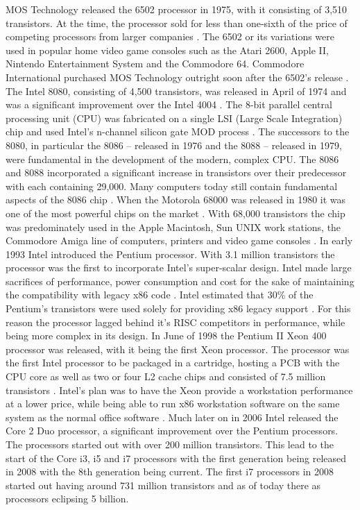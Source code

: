 MOS Technology released the 6502 processor in 1975, with it consisting of 3,510 transistors.
At the time, the processor sold for less than one-sixth of the price of competing processors from larger companies \citep{RN29}.
The 6502 or its variations were used in popular home video game consoles such as the Atari 2600, Apple II, Nintendo Entertainment System and the Commodore 64.
Commodore International purchased MOS Technology outright soon after the 6502’s release \citep{RN29}.
The Intel 8080, consisting of 4,500 transistors, was released in April of 1974 and was a significant improvement over the Intel 4004 \citep{RN8}.
The 8-bit parallel central processing unit (CPU) was fabricated on a single LSI (Large Scale Integration) chip and used Intel’s n-channel silicon gate MOD process \citep{RN10}.
The successors to the 8080, in particular the 8086 – released in 1976 and the 8088 – released in 1979, were fundamental in the development of the modern, complex CPU.
The 8086 and 8088 incorporated a significant increase in transistors over their predecessor with each containing 29,000.
Many computers today still contain fundamental aspects of the 8086 chip \citep{RN11}.  
When the Motorola 68000 was released in 1980 it was one of the most powerful chips on the market \citep{RN18}.
With 68,000 transistors the chip was predominately used in the Apple Macintosh, Sun UNIX work stations, the Commodore Amiga line of computers, printers and video game consoles \citep{RN18}. 
In early 1993 Intel introduced the Pentium processor.
With 3.1 million transistors  \citep{RN13, Intel4584:online} the processor was the first to incorporate Intel’s super-scalar design.
Intel made large sacrifices of performance, power consumption and cost for the sake of maintaining the compatibility with legacy x86 code \citep{RN13}.
Intel estimated that 30\% of the Pentium’s transistors were used solely for providing x86 legacy support \citep{RN7}.
For this reason the processor lagged behind it’s RISC competitors in performance, while being more complex in its design.
In June of 1998 the Pentium II Xeon 400 processor was released, with it being the first Xeon processor.
The processor was the first Intel processor to be packaged in a cartridge, hosting a PCB with the CPU core as well as two or four L2 cache chips \citep{RN12} and consisted of 7.5 million transistors \citep{RN19}.
Intel’s plan was to have the Xeon provide a workstation performance at a lower price, while being able to run x86 workstation software on the same system as the normal office software \citep{RN12}.
Much later on in 2006 Intel released the Core 2 Duo processor, a significant improvement over the Pentium processors.
The processors started out with over 200 million transistors. 
This lead to the start of the Core i3, i5 and i7 processors with the first generation being released in 2008 with the 8th generation being current.
The first i7 processors in 2008 started out having around 731 million transistors and as of today there as processors eclipsing 5 billion.  

